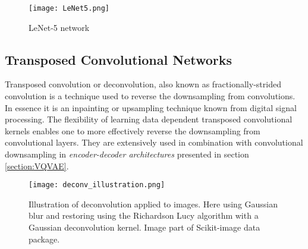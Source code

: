 \documentclass[../../thesis.tex]{subfiles}
\begin{document}
\begin{figure}[h]
    \centering
    \texttt{[image: LeNet5.png]}
    \caption{LeNet-5 network \cite{LeCun1989ConvNet}}
    \label{fig:LeNet5}
\end{figure}


\subsection{Transposed Convolutional Networks}
Transposed convolution or deconvolution, also known as fractionally-strided convolution is a technique used to reverse the downsampling from convolutions. In essence it is an inpainting or upsampling technique known from digital signal processing. The flexibility of learning data dependent transposed convolutional kernels enables one to more effectively reverse the downsampling from convolutional layers. They are extensively used in combination with convolutional downsampling in \textit{encoder-decoder architectures} presented in section \ref{section:VQVAE}.  

\begin{figure}[h]
    \centering
    \texttt{[image: deconv\_illustration.png]}
    \caption{Illustration of deconvolution applied to images. Here using Gaussian blur and restoring using the Richardson Lucy algorithm with a Gaussian deconvolution kernel. Image part of Scikit-image data package.}
\end{figure}








\end{document}
